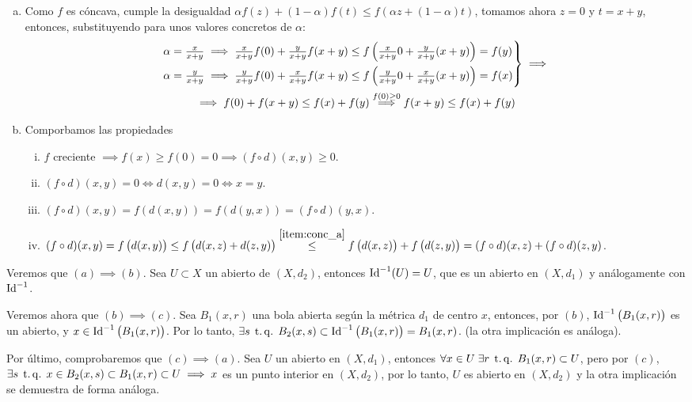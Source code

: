 \begin{ej}
	\begin{enumerate}[(a)]
		\item \label{item:conc_a} Como $f$ es cóncava, cumple la desigualdad $\alpha f(z) + (1-\alpha)f(t) \leq f\left( \alpha z + (1-\alpha)t \right)$, tomamos ahora
			$z = 0$ y $t=x+y$, entonces, substituyendo para unos valores concretos de $\alpha$:
			\begin{gather*}
				\begin{rcases}
					\alpha = \frac{x}{x+y} \implies \frac{x}{x+y}f(0) + \frac{y}{x+y}f(x+y) \leq f\left( \frac{x}{x+y} 0 + \frac{y}{x+y}(x+y)\right) =f(y)\\
					\alpha = \frac{y}{x+y} \implies \frac{y}{x+y}f(0) + \frac{x}{x+y}f(x+y) \leq f\left( \frac{y}{x+y} 0 + \frac{x}{x+y}(x+y)\right) =f(x)
				\end{rcases}
				\implies\\ \implies
				f(0) + f(x+y) \leq f(x) + f(y) \stackrel{f(0) \geq 0}{\implies} f(x+y) \leq f(x) + f(y)
			\end{gather*}
		\item Comporbamos las propiedades
			\begin{enumerate}[i)]
				\item $f$ creciente $\implies f(x) \geq f(0) = 0 \implies (f \circ d)(x,y) \geq 0$.
				\item $(f \circ d)(x,y) = 0 \iff d(x,y) = 0 \iff x = y$.
				\item $(f \circ d)(x,y) = f\left( d(x,y) \right) = f\left( d(y,x) \right) = (f \circ d)(y,x)$.
				\item $(f \circ d)(x,y) = f\left( d(x,y) \right) \leq f\left( d(x,z) + d(z,y) \right) \stackrel{\ref{item:conc_a}}{\leq}f\left( d(x,z) \right) +
					f\left( d(z,y) \right) = (f \circ d)(x,z) + (f \circ d)(z,y)$.
			\end{enumerate}
	\end{enumerate}
\end{ej}

\begin{ej}
	Veremos que $(a) \implies (b)$. Sea $U \subset X$ un abierto de $(X, d_2)$, entonces $\operatorname{Id}^{-1}(U) = U$, que es un abierto en $(X,d_1)$ y análogamente con $\operatorname{Id}^{-1}$.
	
	Veremos ahora que $(b) \implies (c)$. Sea $B_1(x, r)$ una bola abierta según la m\'etrica $d_1$ de centro $x$, entonces, por $(b)$, $\operatorname{Id}^{-1}\left( B_1(x,r) \right)$
	es un abierto, y $x \in \operatorname{Id}^{-1}\left( B_1(x,r) \right)$. Por lo tanto, $\exists s \operatorname{\;t.q.\;} B_2(x,s) \subset \operatorname{Id}^{-1}\left( B_1(x,r) \right) = B_1(x,r)$. (la otra
	implicación es análoga).

	Por último, comprobaremos que $(c) \implies (a)$. Sea $U$ un abierto en $(X,d_1)$, entonces $\forall x \in U \; \exists r \operatorname{\;t.q.\;} B_1(x,r) \subset U$, pero por $(c)$,
	$\exists s \operatorname{\;t.q.\;} x \in B_2(x,s) \subset B_1(x,r) \subset U \implies x$ es un punto interior en $(X, d_2)$, por lo tanto, $U$ es abierto en $(X, d_2)$ y la otra
	implicación se demuestra de forma análoga.
\end{ej}

